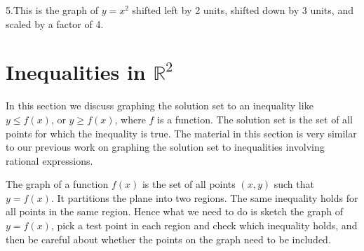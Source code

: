 \documentclass[11pt]{book}               %
\newtheorem{example}{Example}
\begin{document}
5.This is the graph of $y=x^2$ shifted left by 2 units, shifted down by 3 units, and scaled by a factor of 4.
\begin{center}
\end{center}

\newpage
\label{section_plane-inequalities}
\section{Inequalities in $\mathbb{R}^2$ }

In this section we discuss graphing the solution set to an inequality like $y \leq f(x)$, or $y \geq f(x)$, where $f$ is a function.  The solution set is the set of all points for which the inequality is true.  The material in this section is very 
similar to our previous work on graphing the solution set to inequalities involving rational expressions.

The graph of a function $f(x)$ is the set of all points $(x, y)$ such that $y = f(x)$.  
It partitions the plane into two regions.  
The same inequality holds for all points in the same region.
Hence what we need to do is sketch the graph of $y = f(x)$, pick a test point in each region and check which inequality holds, and then be careful about whether the points on the graph need to be included.

%
%
%
%
%
%
\end{document}
